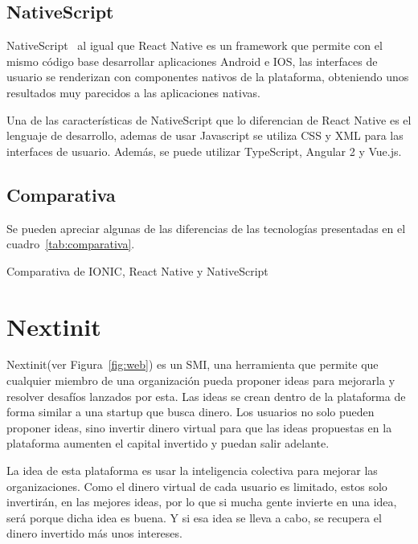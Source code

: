 \subsection{NativeScript}

NativeScript~\cite{NATSCR} al igual que React Native es un framework que permite con el mismo código base desarrollar aplicaciones 
Android e IOS, las interfaces de usuario se renderizan con componentes nativos de la plataforma, obteniendo unos 
resultados muy parecidos a las aplicaciones nativas.

Una de las características de NativeScript que lo diferencian de React Native es el lenguaje de desarrollo, ademas de 
usar Javascript se utiliza CSS y XML para las interfaces de usuario. Además, se puede utilizar TypeScript, Angular 2 y
Vue.js.

\subsection{Comparativa}

Se pueden apreciar algunas de las diferencias de las tecnologías presentadas en el cuadro~\ref{tab:comparativa}.

\begin{table}[comparativa]
	\centering
	{\small
		
	}
	\caption[Comparativa de IONIC, React Native, NativeScript]
	{Comparativa de IONIC, React Native y NativeScript~\cite{comparativaHibridas}}
	\label{tab:comparativa}
\end{table}

 \section{Nextinit}

Nextinit(ver Figura~\ref{fig:web}) es un \acs{SMI}, una herramienta que permite que cualquier miembro de una organización pueda
proponer ideas para  mejorarla y resolver desafíos lanzados por esta. Las ideas se crean dentro de la 
plataforma de forma similar a una startup que busca dinero. Los usuarios no solo pueden  proponer ideas, sino 
invertir dinero virtual para que las ideas propuestas en la plataforma aumenten el capital invertido y 
puedan salir adelante.

La idea de esta plataforma es usar la inteligencia colectiva para mejorar las organizaciones. Como el dinero 
virtual de cada usuario es limitado, estos solo invertirán,  en las mejores ideas, por lo que si mucha gente 
invierte en una idea, será porque dicha idea es buena. Y si esa idea se lleva a cabo, se recupera el dinero 
invertido  más unos intereses.


